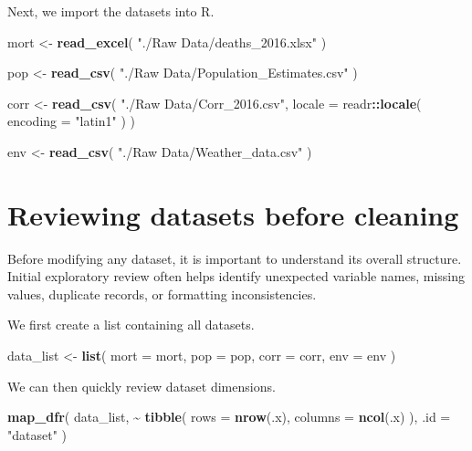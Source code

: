 \documentclass[
  11pt,
  oneside]{book}
\newenvironment{Shaded}{\begin{snugshade}}{\end{snugshade}}
\newcommand{\AttributeTok}[1]{\textcolor[rgb]{0.13,0.29,0.53}{#1}}
\newcommand{\FunctionTok}[1]{\textcolor[rgb]{0.13,0.29,0.53}{\textbf{#1}}}
\newcommand{\NormalTok}[1]{#1}
\newcommand{\OtherTok}[1]{\textcolor[rgb]{0.56,0.35,0.01}{#1}}
\newcommand{\SpecialCharTok}[1]{\textcolor[rgb]{0.81,0.36,0.00}{\textbf{#1}}}
\newcommand{\StringTok}[1]{\textcolor[rgb]{0.31,0.60,0.02}{#1}}
\begin{document}
Next, we import the datasets into R.

\begin{Shaded}
\begin{Highlighting}[]
\NormalTok{mort }\OtherTok{\textless{}{-}} \FunctionTok{read\_excel}\NormalTok{(}
  \StringTok{"./Raw Data/deaths\_2016.xlsx"}
\NormalTok{)}

\NormalTok{pop }\OtherTok{\textless{}{-}} \FunctionTok{read\_csv}\NormalTok{(}
  \StringTok{"./Raw Data/Population\_Estimates.csv"}
\NormalTok{)}

\NormalTok{corr }\OtherTok{\textless{}{-}} \FunctionTok{read\_csv}\NormalTok{(}
  \StringTok{"./Raw Data/Corr\_2016.csv"}\NormalTok{,}
  \AttributeTok{locale =}\NormalTok{ readr}\SpecialCharTok{::}\FunctionTok{locale}\NormalTok{(}
    \AttributeTok{encoding =} \StringTok{"latin1"}
\NormalTok{  )}
\NormalTok{)}

\NormalTok{env }\OtherTok{\textless{}{-}} \FunctionTok{read\_csv}\NormalTok{(}
  \StringTok{"./Raw Data/Weather\_data.csv"}
\NormalTok{)}
\end{Highlighting}
\end{Shaded}

\section{Reviewing datasets before cleaning}\label{reviewing-datasets-before-cleaning}

Before modifying any dataset, it is important to understand its overall structure. Initial exploratory review often helps identify unexpected variable names, missing values, duplicate records, or formatting inconsistencies.

We first create a list containing all datasets.

\begin{Shaded}
\begin{Highlighting}[]
\NormalTok{data\_list }\OtherTok{\textless{}{-}} \FunctionTok{list}\NormalTok{(}
  \AttributeTok{mort =}\NormalTok{ mort,}
  \AttributeTok{pop =}\NormalTok{ pop,}
  \AttributeTok{corr =}\NormalTok{ corr,}
  \AttributeTok{env =}\NormalTok{ env}
\NormalTok{)}
\end{Highlighting}
\end{Shaded}

We can then quickly review dataset dimensions.

\begin{Shaded}
\begin{Highlighting}[]
\FunctionTok{map\_dfr}\NormalTok{(}
\NormalTok{  data\_list,}
  \SpecialCharTok{\textasciitilde{}} \FunctionTok{tibble}\NormalTok{(}
    \AttributeTok{rows =} \FunctionTok{nrow}\NormalTok{(.x),}
    \AttributeTok{columns =} \FunctionTok{ncol}\NormalTok{(.x)}
\NormalTok{  ),}
  \AttributeTok{.id =} \StringTok{"dataset"}
\NormalTok{)}
\end{Highlighting}
\end{Shaded}
\end{document}
